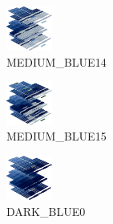 \hspace{0.1cm}
\begin{minipage}[b]{0.15\linewidth}
\begin{figure}[H]                                                          
  \centering                                                             
  \begin{adjustbox}{width=1.5cm,center}                                   
  \includegraphics[width=1.5cm]{src/colorspace_colourflow/flows/colourflow_142-45.png}%
  \end{adjustbox}                                                        
\caption*{MEDIUM\_BLUE14}                                           
\end{figure}                                                               
\end{minipage}
\hspace{0.1cm}
\begin{minipage}[b]{0.15\linewidth}
\begin{figure}[H]                                                          
  \centering                                                             
  \begin{adjustbox}{width=1.5cm,center}                                   
  \includegraphics[width=1.5cm]{src/colorspace_colourflow/flows/colourflow_143-45.png}%
  \end{adjustbox}                                                        
\caption*{MEDIUM\_BLUE15}                                           
\end{figure}                                                               
\end{minipage}
\hspace{0.1cm}
\begin{minipage}[b]{0.15\linewidth}
\begin{figure}[H]                                                          
  \centering                                                             
  \begin{adjustbox}{width=1.5cm,center}                                   
  \includegraphics[width=1.5cm]{src/colorspace_colourflow/flows/colourflow_144-45.png}%
  \end{adjustbox}                                                        
\caption*{DARK\_BLUE0}                                           
\end{figure}                                                               
\end{minipage}
